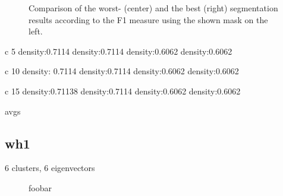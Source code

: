 \begin{figure}[H]
\begin{center}
\end{center}
\caption[Chair 3 Cast Worst/Best Result]{Comparison of the worst- (center) and the best (right) segmentation results according to the F1 measure using the shown mask on the left.}
\label{fig:chair_3_cast_gt_worst_best}
\end{figure}


c 5
density:0.7114
density:0.7114
density:0.6062
density:0.6062

c 10
density: 0.7114
density:0.7114
density:0.6062
density:0.6062

c 15
density:0.71138
density:0.7114
density:0.6062
density:0.6062


avgs







\subsection{wh1}

6 clusters, 6 eigenvectors

\begin{figure}[H]
\begin{center}
\end{center}
\caption[Segmentations Waving Hand]{foobar}
\label{fig:wh1_performance}
\end{figure}


